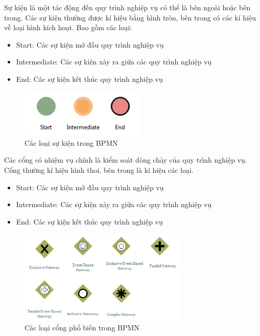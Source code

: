 Sự kiện là một tác động đến quy trình nghiệp vụ có thể là bên ngoài hoặc bên trong. Các sự kiện thường được kí hiệu bằng hình tròn, bên trong có các kí hiệu về loại hình kích hoạt. Bao gồm các loại:
\begin{itemize}
	\item Start: Các sự kiện mở đầu quy trình nghiệp vụ
	\item Intermediate: Các sự kiện xảy ra giữa các quy trình nghiệp vụ
	\item End: Các sự kiện kết thúc quy trình nghiệp vụ
\end{itemize}
\begin{figure}[!htp]
	\begin{center}
		\includegraphics[width=6cm]{img/theory/BPMN/Event.png}
	\end{center}
	\caption{Các loại sự kiện trong BPMN \cite{theoryBPMN1}}
\end{figure}


Các cổng có nhiệm vụ chính là kiểm soát dòng chảy của quy trình nghiệp vụ. Cổng thường kí hiệu hình thoi, bên trong là kí hiệu các loại.
\begin{itemize}
	\item Start: Các sự kiện mở đầu quy trình nghiệp vụ
	\item Intermediate: Các sự kiện xảy ra giữa các quy trình nghiệp vụ
	\item End: Các sự kiện kết thúc quy trình nghiệp vụ
\end{itemize}
\begin{figure}[!htp]
	\begin{center}
		\includegraphics[width=8cm]{img/theory/BPMN/Gateway.png}
	\end{center}
	\caption{Các loại cổng phổ biến trong BPMN \cite{theoryBPMN1}}
\end{figure}



